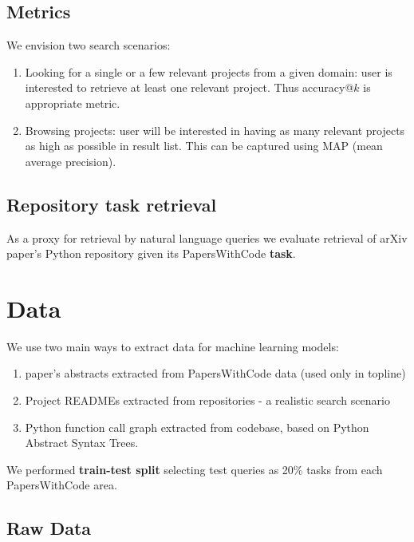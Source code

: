 \documentclass[11pt]{report}
\begin{document}
\section{Metrics}

We envision two search scenarios:

\begin{enumerate}
\item Looking for a single or a few relevant projects from a given domain: user is interested to retrieve at least one relevant project. Thus accuracy@$k$ is appropriate metric.
\item Browsing projects: user will be interested in having as many relevant projects as high as possible in result list. This can be captured using MAP (mean average precision).
\end{enumerate}





\section{Repository task retrieval}

As a proxy for retrieval by natural language queries we  evaluate retrieval of arXiv paper's Python repository given its PapersWithCode \textbf{task}.

\chapter{Data}

We use two main ways to extract data for machine learning models:

\begin{enumerate}

\item paper's abstracts extracted from PapersWithCode data (used only in topline)

\item Project READMEs extracted from repositories - a realistic search scenario

\item Python function call graph extracted from codebase, based on Python Abstract Syntax Trees. 

\end{enumerate}

We performed \textbf{train-test split} selecting test queries as 20\% tasks from each PapersWithCode area.

\section{Raw Data}
\end{document}
